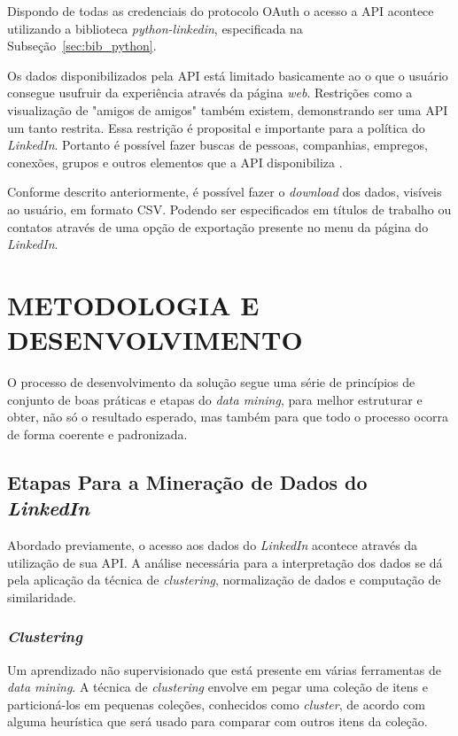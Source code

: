Dispondo de todas as credenciais do protocolo OAuth o acesso a API acontece utilizando a biblioteca \textit{python-linkedin}, especificada na Subseção~\ref{sec:bib_python}.

Os dados disponibilizados pela API está limitado basicamente ao o que o usuário consegue usufruir da experiência através da página \textit{web}. Restrições como a visualização de "amigos de amigos" \space também existem, demonstrando ser uma API um tanto restrita. Essa restrição é proposital e importante para a política do \textit{LinkedIn}. Portanto é possível fazer buscas de pessoas, companhias, empregos, conexões, grupos e outros elementos que a API disponibiliza \cite{mining-social-web}.

Conforme descrito anteriormente, é possível fazer o \textit{download} dos dados, visíveis ao usuário, em formato CSV. Podendo ser especificados em títulos de trabalho ou contatos através de uma opção de exportação presente no menu da página do \textit{LinkedIn}.

\section{METODOLOGIA E DESENVOLVIMENTO}\label{sec: metodologia}
O processo de desenvolvimento da solução segue uma série de princípios de conjunto de boas práticas e etapas do \textit{data mining}, para melhor estruturar e obter, não só o resultado esperado, mas também para que todo o processo ocorra de forma coerente e padronizada.

\subsection{Etapas Para a Mineração de Dados do \textit{LinkedIn}}
Abordado previamente, o acesso aos dados do \textit{LinkedIn} acontece através da utilização de sua API. A análise necessária para a interpretação dos dados se dá pela aplicação da técnica de \textit{clustering}, normalização de dados e computação de similaridade. 

\subsubsection{\textbf{\textit{Clustering}}} 
Um aprendizado não supervisionado que está presente em várias ferramentas de \textit{data mining}. A técnica de \textit{clustering} envolve em pegar uma coleção de itens e particioná-los em pequenas coleções, conhecidos como \textit{cluster}, de acordo com alguma heurística que será usado para comparar com outros itens da coleção.

